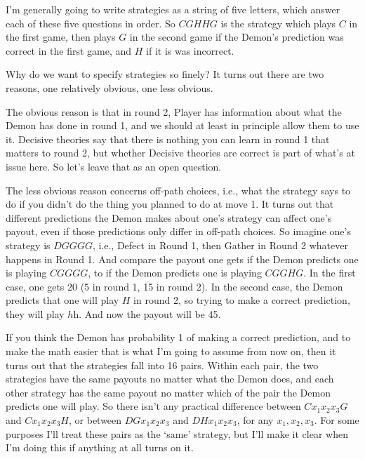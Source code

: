 \documentclass[
  12pt,
]{article}
\begin{document}
I'm generally going to write strategies as a string of five letters,
which answer each of these five questions in order. So \(CGHHG\) is the
strategy which plays \(C\) in the first game, then plays \(G\) in the
second game if the Demon's prediction was correct in the first game, and
\(H\) if it is was incorrect.

Why do we want to specify strategies so finely? It turns out there are
two reasons, one relatively obvious, one less obvious.

The obvious reason is that in round 2, Player has information about what
the Demon has done in round 1, and we should at least in principle allow
them to use it. Decisive theories say that there is nothing you can
learn in round 1 that matters to round 2, but whether Decisive theories
are correct is part of what's at issue here. So let's leave that as an
open question.

The less obvious reason concerns off-path choices, i.e., what the
strategy says to do if you didn't do the thing you planned to do at move
1. It turns out that different predictions the Demon makes about one's
strategy can affect one's payout, even if those predictions only differ
in off-path choices. So imagine one's strategy is \(DGGGG\), i.e.,
Defect in Round 1, then Gather in Round 2 whatever happens in Round 1.
And compare the payout one gets if the Demon predicts one is playing
\(CGGGG\), to if the Demon predicts one is playing \(CGGHG\). In the
first case, one gets 20 (5 in round 1, 15 in round 2). In the second
case, the Demon predicts that one will play \(H\) in round 2, so trying
to make a correct prediction, they will play \(h\)h. And now the payout
will be 45.

If you think the Demon has probability 1 of making a correct prediction,
and to make the math easier that is what I'm going to assume from now
on, then it turns out that the strategies fall into 16 pairs. Within
each pair, the two strategies have the same payouts no matter what the
Demon does, and each other strategy has the same payout no matter which
of the pair the Demon predicts one will play. So there isn't any
practical difference between \(Cx_1x_2x_3G\) and \(Cx_1x_2x_3H\), or
between \(DGx_1x_2x_3\) and \(DHx_1x_2x_3\), for any \(x_1, x_2, x_3\).
For some purposes I'll treat these pairs as the `same' strategy, but
I'll make it clear when I'm doing this if anything at all turns on it.
\end{document}
